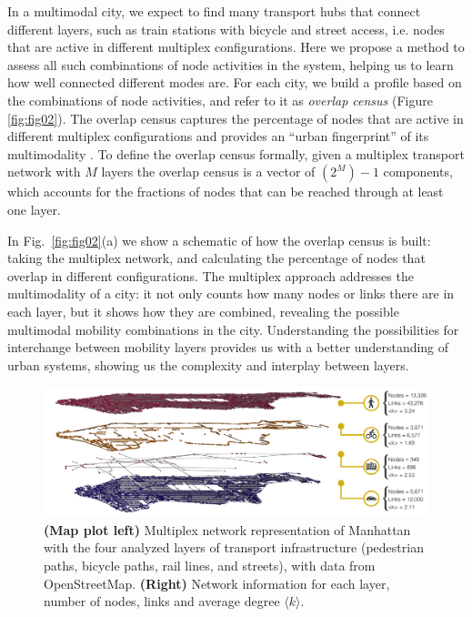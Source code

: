 In a multimodal city, we expect to find many transport hubs that connect different layers, such as train stations with bicycle and street access, i.e. nodes that are active in different multiplex configurations. Here we propose a method to assess all such combinations of node activities in the system, helping us to learn how well connected different modes are. For each city, we build a profile based on the combinations of node activities, and refer to it as \emph{overlap census} (Figure \ref{fig:fig02}). The overlap census captures the percentage of nodes that are active in different multiplex configurations and provides an ``urban fingerprint'' of its multimodality \cite{Aleta2017Multilayer}. To define the overlap census formally, given a multiplex transport network with $M$ layers the overlap census is a vector of $(2^M)-1$ components, which accounts for the fractions of nodes that can be reached through at least one layer.

In Fig.~\ref{fig:fig02}(a) we show a schematic of how the overlap census is built: taking the multiplex network, and calculating the percentage of nodes that overlap in different configurations. The multiplex approach addresses the multimodality of a city: it not only counts how many nodes or links there are in each layer, but it shows how they are combined, revealing the possible multimodal mobility combinations in the city. Understanding the possibilities for interchange between mobility layers provides us with a better understanding of urban systems, showing us the complexity and interplay between layers.

\begin{figure}[t!]
	\centering
	\includegraphics[width=\textwidth]{images/multiplex/Multilayer_NY_op2.png}
	\caption{\textbf{(Map plot left)} Multiplex network representation of Manhattan with the four analyzed layers of transport infrastructure (pedestrian paths, bicycle paths, rail lines, and streets), with data from OpenStreetMap. \textbf{(Right)} Network information for each layer, number of nodes, links and average degree $\langle k \rangle$.}
	\label{fig:fig01}
\end{figure}


